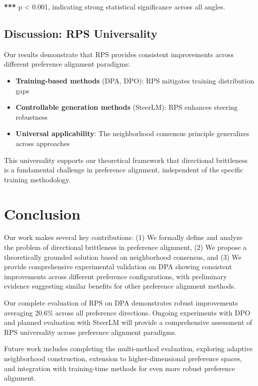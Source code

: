 \documentclass{article} %
\begin{document}
\textbf{***} p < 0.001, indicating strong statistical significance across all angles.

\subsection{Discussion: RPS Universality}

Our results demonstrate that RPS provides consistent improvements across different preference alignment paradigms:

\begin{itemize}
    \item \textbf{Training-based methods} (DPA, DPO): RPS mitigates training distribution gaps
    \item \textbf{Controllable generation methods} (SteerLM): RPS enhances steering robustness
    \item \textbf{Universal applicability}: The neighborhood consensus principle generalizes across approaches
\end{itemize}

This universality supports our theoretical framework that directional brittleness is a fundamental challenge in preference alignment, independent of the specific training methodology.

\section{Conclusion}

Our work makes several key contributions: (1) We formally define and analyze the problem of directional brittleness in preference alignment, (2) We propose a theoretically grounded solution based on neighborhood consensus, and (3) We provide comprehensive experimental validation on DPA showing consistent improvements across different preference configurations, with preliminary evidence suggesting similar benefits for other preference alignment methods.

Our complete evaluation of RPS on DPA demonstrates robust improvements averaging 20.6\% across all preference directions. Ongoing experiments with DPO and planned evaluation with SteerLM will provide a comprehensive assessment of RPS universality across preference alignment paradigms.

Future work includes completing the multi-method evaluation, exploring adaptive neighborhood construction, extension to higher-dimensional preference spaces, and integration with training-time methods for even more robust preference alignment.
\end{document}
